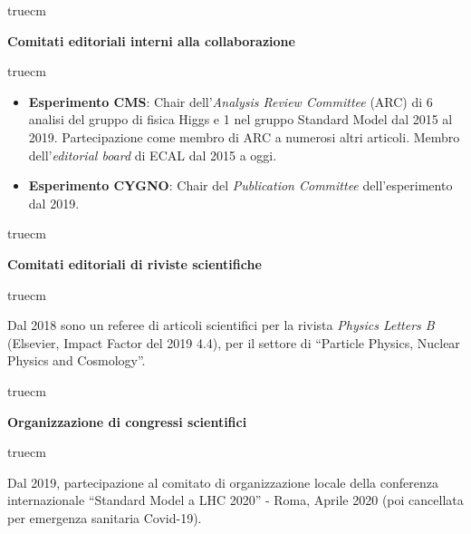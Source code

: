 \documentclass[11pt,twoside,a4paper]{article}
\begin{document}
\clearpage

 truecm
\begin{center}
\textbf{Comitati editoriali interni alla collaborazione}
\end{center}
 truecm

\begin{itemize}
\item \textbf{Esperimento CMS}: Chair dell'\textit{Analysis Review
  Committee} (ARC) di 6 analisi del gruppo di fisica Higgs e 1 nel
  gruppo Standard Model dal 2015 al 2019. Partecipazione come membro
  di ARC a numerosi altri articoli. Membro dell'\textit{editorial
    board} di ECAL dal 2015 a oggi.
\item \textbf{Esperimento CYGNO}: Chair del \textit{Publication
  Committee} dell'esperimento dal 2019.
\end{itemize}


 truecm
\begin{center}
\textbf{Comitati editoriali di riviste scientifiche}
\end{center}
 truecm

Dal 2018 sono un referee di articoli scientifici per la rivista
\textit{Physics Letters B} (Elsevier, Impact Factor del 2019 4.4), per
il settore di ``Particle Physics, Nuclear Physics and Cosmology''.


 truecm
\begin{center}
\textbf{Organizzazione di congressi scientifici}
\end{center}
 truecm

Dal 2019, partecipazione al comitato di organizzazione locale della
conferenza internazionale ``Standard Model a LHC 2020'' - Roma, Aprile
2020 (poi cancellata per emergenza sanitaria Covid-19).
\end{document}
